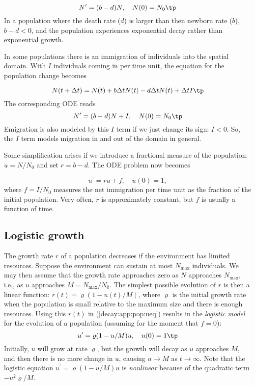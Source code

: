 \documentclass[graybox,sectrefs,envcountresetchap,open=right,final]{svmonodo}
\begin{document}
\begin{equation}
N^{\prime} = (b-d)N,\quad N(0)=N_0\tp
\end{equation}
In a population where the death rate ($d$) is larger than
then newborn rate ($b$), $b-d < 0$, and the population experiences
exponential decay rather than exponential growth.

In some populations there is an immigration of individuals into the
spatial domain. With $I$ individuals coming in per time unit,
the equation for the population change becomes

\[ N(t+\Delta t) = N(t) + b\Delta t N(t) - d\Delta t N(t) + \Delta t I\tp  \]
The corresponding ODE reads
\begin{equation}
N^{\prime} = (b-d)N + I,\quad N(0)=N_0
\tp
\end{equation}
Emigration is also modeled by this $I$ term if we just change its sign: $I < 0$.
So, the $I$ term models migration in and out of the domain in general.

Some simplification arises if we introduce a fractional measure
of the population: $u=N/N_0$ and set $r=b-d$. The ODE problem
now becomes

\begin{equation}
u^{\prime} = ru + f,\quad u(0)=1,
\label{decay:app:pop:ueq}
\end{equation}
where $f=I/N_0$ measures the net immigration per time unit as
the fraction of the initial population. Very often, $r$ is approximately
constant, but $f$ is usually a function of time.

\subsection{Logistic growth}
\label{decay:app:pop:log}


The growth rate $r$ of a population decreases if the environment
has limited resources. Suppose the environment can sustain at
most $N_{\max}$ individuals. We may then assume that the growth rate
approaches zero as $N$ approaches $N_{\max}$, i.e., as $u$ approaches
$M=N_{\max}/N_0$. The simplest possible evolution of $r$ is then a
linear function: $r(t)={\varrho}(1-u(t)/M)$, where $\varrho$
is the initial growth rate when the population is small relative to the
maximum size and there is enough resources. Using this $r(t)$ in
(\ref{decay:app:pop:ueq}) results in the \emph{logistic model} for the
evolution of a population (assuming for the moment that $f=0$):
\begin{equation}
u^{\prime} = {\varrho}(1-u/M)u,\quad u(0)=1
\tp
\label{decay:app:pop:logistic}
\end{equation}
Initially, $u$ will grow at rate $\varrho$, but the growth will decay
as $u$ approaches $M$, and then there is no more change in $u$, causing
$u\rightarrow M$ as $t\rightarrow\infty$.
Note that the logistic equation $u^{\prime}={\varrho}(1-u/M)u$ is \emph{nonlinear} because
of the quadratic term $-u^2{\varrho}/M$.
\end{document}
